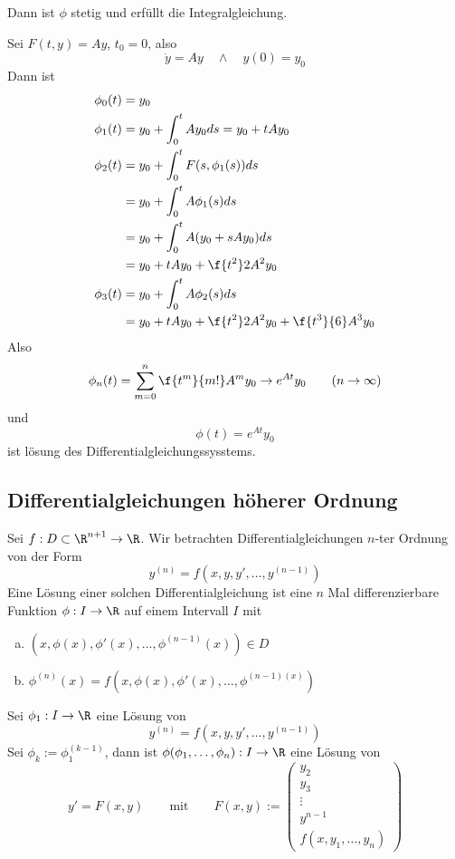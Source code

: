 \documentclass[a4paper,10pt]{scrartcl}
\begin{document}
Dann ist $\phi$ stetig und erfüllt die Integralgleichung.


\begin{ex*}
	Sei $F(t,y) = Ay$, $t_0=0$, also
	\[
		\dot y = Ay \quad \land \quad y(0) = y_0
	\]
	Dann ist
	\begin{align*}
		\phi_0(t) &= y_0\\
		\phi_1(t) &= y_0 + \int_0^t Ay_0 ds = y_0 + tAy_0\\
		\phi_2(t) &= y_0 + \int_0^t F(s,\phi_1(s)) ds \\
							  &= y_0 + \int_0^t A\phi_1(s) ds\\
					 &=y_0 + \int_0^t A(y_0+sAy_0)ds\\
			   &= y_0 + tAy_0 +\f {t^2}2 A^2y_0\\
		\phi_3(t) &= y_0 + \int_0^t A\phi_2(s) ds\\
									   &= y_0 + tAy_0 + \f{t^2}2 A^2y_0 + \f{t^3}{6} A^3y_0
	\end{align*}
	Also
	\[
		\phi_n(t) = \sum_{m=0}^n\f{t^m}{m!}A^m y_0 \to e^{At}y_0 \qquad (n\to \infty)
	\]
	und
	\[
		\phi(t) = e^{At}y_0
	\]
	ist lösung des Differentialgleichungssysstems.
\end{ex*}


\subsection{Differentialgleichungen höherer Ordnung}


Sei $f:D\subset \R^{n+1}\to \R$.
Wir betrachten Differentialgleichungen $n$-ter Ordnung von der Form
\[
	y^{(n)} = f(x,y,y',\dotsc,y^{(n-1)})
\]
Eine Lösung einer solchen Differentialgleichung ist eine $n$ Mal differenzierbare Funktion $\phi : I\to \R$ auf einem Intervall $I$ mit
\begin{enumerate}[(a)]
	\item
		$(x,\phi(x),\phi'(x),\dotsc,\phi^{(n-1)}(x)) \in D$
	\item
		$\phi^{(n)}(x) = f(x,\phi(x),\phi'(x), \dotsc, \phi^{(n-1)(x)})$
\end{enumerate}

Sei $\phi_1 : I\to \R$ eine Lösung von
\[
	y^{(n)} = f(x,y,y',\dotsc,y^{(n-1)})
\]
Sei $\phi_k := \phi_1^{(k-1)}$, dann ist $\phi(\phi_1,\dotsc, \phi_n) : I \to \R$ eine Lösung von
\[
	y' = F(x,y) \qquad \text{mit} \qquad F(x,y) := \begin{pmatrix}y_2 \\ y_3 \\\vdots\\ y^{n-1}\\f(x,y_1,\dotsc,y_n)\end{pmatrix}
\]
\end{document}
